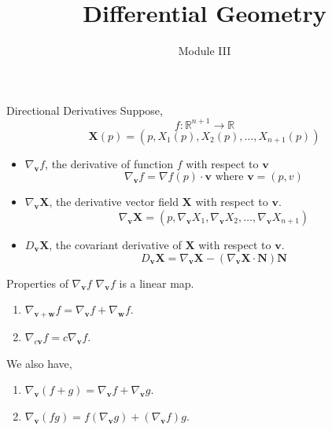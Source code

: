 \documentclass{beamer}
\title{Differential Geometry}
\author{Module III}
\institute{Chapter 9 : Weingarten Map}
\begin{document}
\begin{frame}
\maketitle
\end{frame}

\begin{frame}{Directional Derivatives}
	Suppose,
	$$ f : \mathbb{R}^{n+1} \to \mathbb{R} $$
	$$ \boldsymbol{X}(p) = \left(p,X_1(p),X_2(p),\dots,X_{n+1}(p) \right) $$ %
\begin{itemize}
	\item $\nabla_{\boldsymbol{v}} f$, the derivative of function $f$ with respect to $\boldsymbol{v}$
		$$ \nabla_{\boldsymbol{v}} f = \nabla f(p) \cdot \boldsymbol{v} \text{ where } \boldsymbol{v} = (p,v)$$
	\item $\nabla_{\boldsymbol{v}} \boldsymbol{X}$, the derivative vector field $\boldsymbol{X}$ with respect to $\boldsymbol{v}$.
		$$ \nabla_{\boldsymbol{v}} \boldsymbol{X} = \left(p,\nabla_{\boldsymbol{v}} X_1,\nabla_{\boldsymbol{v}} X_2,\dots,\nabla_{\boldsymbol{v}} X_{n+1} \right) $$
	\item $D_{\boldsymbol{v}} \boldsymbol{X}$, the covariant derivative of $\boldsymbol{X}$ with respect to $\boldsymbol{v}$.
		$$ D_{\boldsymbol{v}} \boldsymbol{X} = \nabla_{\boldsymbol{v}} \boldsymbol{X} - \left( \nabla_{\boldsymbol{v}} \boldsymbol{X} \cdot \boldsymbol{N} \right) \boldsymbol{N} $$
\end{itemize}
\end{frame}

\begin{frame}{Properties of $\nabla_{\boldsymbol{v}} f$}
	$\nabla_{\boldsymbol{v}} f$ is a linear map. 
	\begin{enumerate}
		\item $\nabla_{\boldsymbol{v} + \boldsymbol{w}} f = \nabla_{\boldsymbol{v}} f + \nabla_{\boldsymbol{w}} f$.
		\item $\nabla_{c\boldsymbol{v}} f = c \nabla_{\boldsymbol{v}} f$.
	\end{enumerate}
	\vfill
	We also have,
	\begin{enumerate}
		\item $\nabla_{\boldsymbol{v}} (f+g) = \nabla_{\boldsymbol{v}} f + \nabla_{\boldsymbol{v}} g$.
		\item $\nabla_{\boldsymbol{v}} (fg) = f (\nabla_{\boldsymbol{v}} g) + (\nabla_{\boldsymbol{v}} f)g$.
	\end{enumerate}
\end{frame}
\end{document}
